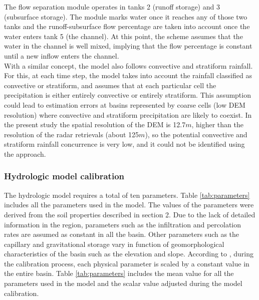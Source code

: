 \documentclass[hess, manuscript]{copernicus}
\begin{document}
The flow separation module operates in tanks 2 (runoff storage) and 3 (subsurface storage).  The module marks water once it reaches any of those two tanks and the runoff-subsurface flow percentage are taken into account once the water enters tank 5 (the channel).   At this point, the scheme assumes that the water in the channel is well mixed,  implying that the flow percentage is constant until a new inflow enters the channel.\\

With a similar concept, the model also follows convective and stratiform rainfall.  For this, at each time step, the model takes into account the rainfall classified as convective or stratiform, and assumes that at each particular cell the precipitation is either entirely convective or entirely stratiform. This assumption could lead to estimation errors at basins represented by coarse cells (low DEM resolution) where convective and stratiform precipitation are likely to coexist. In the present study the spatial resolution of the DEM is 12.7$m$, higher than the resolution of the radar retrievals (about 125$m$), so the potential convective and stratiform rainfall concurrence is very low, and it could not be identified using the \cite{Steiner1995} approach.\\

\subsubsection{Hydrologic model calibration}

The hydrologic model requires a total of ten parameters. Table \ref{tab:parameters} includes all the parameters used in the model.  The values of the parameters were derived from the soil properties described in section 2. Due to the lack of detailed information in the region, parameters such as the infiltration and percolation rates are assumed as constant in all the basin.  Other parameters such as the capillary and gravitational storage vary in function of geomorphological characteristics of the basin such as the elevation and slope. According to \cite{Frances2007c}, during the calibration process, each physical parameter is scaled by a constant value in the entire basin. Table \ref{tab:parameters} includes the mean value for all the parameters used in the model and the scalar value adjusted during the model calibration.
\end{document}
